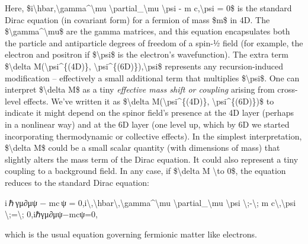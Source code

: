 \documentclass[]{article}
\begin{document}
Here,
\$i\textbackslash{}hbar,\textbackslash{}gamma\^{}\textbackslash{}mu
\textbackslash{}partial\_\textbackslash{}mu \textbackslash{}psi - m
c,\textbackslash{}psi = 0\$ is the standard Dirac equation (in covariant
form) for a fermion of mass \$m\$ in 4D. The
\$\textbackslash{}gamma\^{}\textbackslash{}mu\$ are the gamma matrices,
and this equation encapsulates both the particle and antiparticle
degrees of freedom of a spin-½ field (for example, the electron and
positron if \$\textbackslash{}psi\$ is the electron's wavefunction). The
extra term \$\textbackslash{}delta M(\textbackslash{}psi\^{}\{(4D)\},
\textbackslash{}psi\^{}\{(6D)\}),\textbackslash{}psi\$ represents any
recursion-induced modification -- effectively a small additional term
that multiplies \$\textbackslash{}psi\$. One can interpret
\$\textbackslash{}delta M\$ as a tiny \emph{effective mass shift or
coupling} arising from cross-level effects. We've written it as
\$\textbackslash{}delta M(\textbackslash{}psi\^{}\{(4D)\},
\textbackslash{}psi\^{}\{(6D)\})\$ to indicate it might depend on the
spinor field's presence at the 4D layer (perhaps in a nonlinear way) and
at the 6D layer (one level up, which by 6D we started incorporating
thermodynamic or collective effects). In the simplest interpretation,
\$\textbackslash{}delta M\$ could be a small scalar quantity (with
dimensions of mass) that slightly alters the mass term of the Dirac
equation. It could also represent a tiny coupling to a background field.
In any case, if \$\textbackslash{}delta M \textbackslash{}to 0\$, the
equation reduces to the standard Dirac equation:

i ℏ γμ∂μψ  −  mc ψ  =  0,i\textbackslash{},\textbackslash{}hbar\textbackslash{},\textbackslash{}gamma\^{}\textbackslash{}mu
\textbackslash{}partial\_\textbackslash{}mu \textbackslash{}psi
\textbackslash{};-\textbackslash{}; m
c\textbackslash{},\textbackslash{}psi
\textbackslash{};=\textbackslash{}; 0,iℏγμ∂μ​ψ−mcψ=0,

which is the usual equation governing fermionic matter like electrons.
\end{document}
